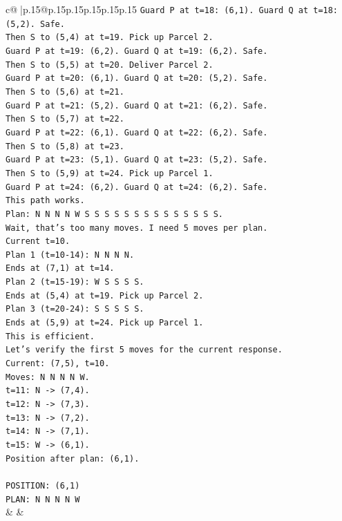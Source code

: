 \documentclass{article}
\begin{document}
{\begin{supertabular}{c@{$\;$}|p{.15\linewidth}@{}p{.15\linewidth}p{.15\linewidth}p{.15\linewidth}p{.15\linewidth}p{.15\linewidth}}
{{{\texttt{Guard P at t=18: (6,1). Guard Q at t=18: (5,2). Safe.} \\
\texttt{Then S to (5,4) at t=19. Pick up Parcel 2.} \\
\texttt{Guard P at t=19: (6,2). Guard Q at t=19: (6,2). Safe.} \\
\texttt{Then S to (5,5) at t=20. Deliver Parcel 2.} \\
\texttt{Guard P at t=20: (6,1). Guard Q at t=20: (5,2). Safe.} \\
\texttt{Then S to (5,6) at t=21.} \\
\texttt{Guard P at t=21: (5,2). Guard Q at t=21: (6,2). Safe.} \\
\texttt{Then S to (5,7) at t=22.} \\
\texttt{Guard P at t=22: (6,1). Guard Q at t=22: (6,2). Safe.} \\
\texttt{Then S to (5,8) at t=23.} \\
\texttt{Guard P at t=23: (5,1). Guard Q at t=23: (5,2). Safe.} \\
\texttt{Then S to (5,9) at t=24. Pick up Parcel 1.} \\
\texttt{Guard P at t=24: (6,2). Guard Q at t=24: (6,2). Safe.} \\
\texttt{This path works.} \\
\texttt{Plan: N N N N W S S S S S S S S S S S S S S.} \\
\texttt{Wait, that's too many moves. I need 5 moves per plan.} \\
\texttt{Current t=10.} \\
\texttt{Plan 1 (t=10{-}14): N N N N.} \\
\texttt{Ends at (7,1) at t=14.} \\
\texttt{Plan 2 (t=15{-}19): W S S S S.} \\
\texttt{Ends at (5,4) at t=19. Pick up Parcel 2.} \\
\texttt{Plan 3 (t=20{-}24): S S S S S.} \\
\texttt{Ends at (5,9) at t=24. Pick up Parcel 1.} \\
\texttt{This is efficient.} \\
\texttt{Let's verify the first 5 moves for the current response.} \\
\texttt{Current: (7,5), t=10.} \\
\texttt{Moves: N N N N W.} \\
\texttt{t=11: N {-}> (7,4).} \\
\texttt{t=12: N {-}> (7,3).} \\
\texttt{t=13: N {-}> (7,2).} \\
\texttt{t=14: N {-}> (7,1).} \\
\texttt{t=15: W {-}> (6,1).} \\
\texttt{Position after plan: (6,1).} \\
\\ 
\texttt{POSITION: (6,1)} \\
\texttt{PLAN: N N N N W} \\
            }
        }
    }
    & & \\ \\


\end{supertabular}}
\end{document}
